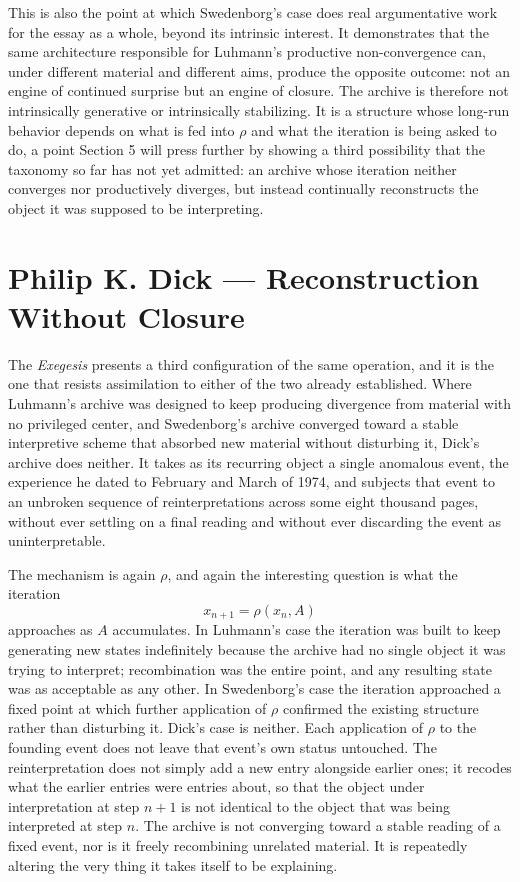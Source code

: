 \documentclass[11pt]{article}
\begin{document}
This is also the point at which Swedenborg's case does real argumentative work for the essay as a whole, beyond its intrinsic interest. It demonstrates that the same architecture responsible for Luhmann's productive non-convergence can, under different material and different aims, produce the opposite outcome: not an engine of continued surprise but an engine of closure. The archive is therefore not intrinsically generative or intrinsically stabilizing. It is a structure whose long-run behavior depends on what is fed into $\rho$ and what the iteration is being asked to do, a point Section 5 will press further by showing a third possibility that the taxonomy so far has not yet admitted: an archive whose iteration neither converges nor productively diverges, but instead continually reconstructs the object it was supposed to be interpreting.

\section{Philip K. Dick --- Reconstruction Without Closure}

The \emph{Exegesis} presents a third configuration of the same operation, and it is the one that resists assimilation to either of the two already established. Where Luhmann's archive was designed to keep producing divergence from material with no privileged center, and Swedenborg's archive converged toward a stable interpretive scheme that absorbed new material without disturbing it, Dick's archive does neither. It takes as its recurring object a single anomalous event, the experience he dated to February and March of 1974, and subjects that event to an unbroken sequence of reinterpretations across some eight thousand pages, without ever settling on a final reading and without ever discarding the event as uninterpretable.

The mechanism is again $\rho$, and again the interesting question is what the iteration
\[
x_{n+1} = \rho(x_n, A)
\]
approaches as $A$ accumulates. In Luhmann's case the iteration was built to keep generating new states indefinitely because the archive had no single object it was trying to interpret; recombination was the entire point, and any resulting state was as acceptable as any other. In Swedenborg's case the iteration approached a fixed point at which further application of $\rho$ confirmed the existing structure rather than disturbing it. Dick's case is neither. Each application of $\rho$ to the founding event does not leave that event's own status untouched. The reinterpretation does not simply add a new entry alongside earlier ones; it recodes what the earlier entries were entries about, so that the object under interpretation at step $n+1$ is not identical to the object that was being interpreted at step $n$. The archive is not converging toward a stable reading of a fixed event, nor is it freely recombining unrelated material. It is repeatedly altering the very thing it takes itself to be explaining.
\end{document}
